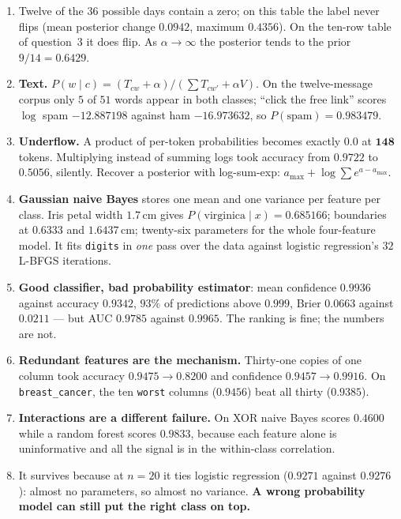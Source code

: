 \documentclass[11pt]{article}
\begin{document}
\begin{enumerate}[leftmargin=*]
    makes the whole product zero and the class impossible. Laplace,
    $(0+1)/(5+3) = 0.125$, turns $P(\text{No} \mid x)$ from $0.000000$ into
    $\mathbf{0.278417}$. Add $\alpha$ on top and $\alpha n_j$ below, where
    $n_j$ is the number of \emph{levels}.
  \item Twelve of the $36$ possible days contain a zero; on this table the
    label never flips (mean posterior change $0.0942$, maximum $0.4356$).
    On the ten-row table of question~3 it does flip. As
    $\alpha \to \infty$ the posterior tends to the prior $9/14 = 0.6429$.
  \item \textbf{Text.} $P(w \mid c) = (T_{cw}+\alpha)/(\sum T_{cw'} + \alpha
    V)$. On the twelve-message corpus only $5$ of $51$ words appear in both
    classes; ``click the free link'' scores $\log$ spam $-12.887198$ against
    ham $-16.973632$, so $P(\text{spam}) = 0.983479$.
  \item \textbf{Underflow.} A product of per-token probabilities becomes
    exactly $0.0$ at $\mathbf{148}$ tokens. Multiplying instead of summing
    logs took accuracy from $0.9722$ to $\mathbf{0.5056}$, silently. Recover a
    posterior with log-sum-exp: $a_{\max} + \log\sum e^{a - a_{\max}}$.
  \item \textbf{Gaussian naive Bayes} stores one mean and one variance per
    feature per class. Iris petal width $1.7$\,cm gives
    $P(\text{virginica} \mid x) = 0.685166$; boundaries at $0.6333$ and
    $1.6437$\,cm; twenty-six parameters for the whole four-feature model. It
    fits \texttt{digits} in \emph{one} pass over the data against logistic
    regression's $32$ L-BFGS iterations.
  \item \textbf{Good classifier, bad probability estimator}: mean confidence
    $\mathbf{0.9936}$ against accuracy $\mathbf{0.9342}$, $93\%$ of
    predictions above $0.999$, Brier $0.0663$ against $0.0211$ --- but AUC
    $0.9785$ against $0.9965$. The ranking is fine; the numbers are not.
  \item \textbf{Redundant features are the mechanism.} Thirty-one copies of
    one column took accuracy $0.9475 \to 0.8200$ and confidence
    $0.9457 \to 0.9916$. On \texttt{breast\_cancer}, the ten
    \texttt{worst} columns ($0.9456$) beat all thirty ($0.9385$).
  \item \textbf{Interactions are a different failure.} On XOR naive Bayes
    scores $0.4600$ while a random forest scores $0.9833$, because each
    feature alone is uninformative and all the signal is in the
    within-class correlation.
  \item It survives because at $n = 20$ it ties logistic regression
    ($0.9271$ against $0.9276$): almost no parameters, so almost no variance.
    \textbf{A wrong probability model can still put the right class on
    top.}
\end{enumerate}
\end{document}
